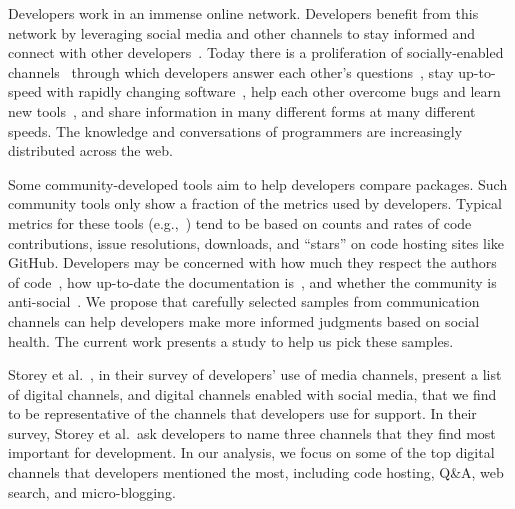 Developers work in an immense online network.
Developers benefit from this network by
leveraging social media and other channels to stay informed
and connect with other developers~\cite{singer_software_2014,storey_how_2016}.
Today there is a proliferation of socially-enabled channels~\cite{storey_revolution_2014} through which developers
answer each other's questions~\cite{mamykina_fastest_2011},
stay up-to-speed with rapidly changing software~\cite{linares-vasquez_how_2014},
help each other overcome bugs and learn new tools~\cite{parnin_blogging_2013},
and share information in many different forms at many different speeds.
The knowledge and conversations of programmers are increasingly distributed across the web.

Some community-developed tools aim to help developers compare packages.
Such community tools only show a fraction of the metrics used by developers.
Typical metrics for these tools (e.g.,~\cite{awesome_python,ruby_toolbox,package_quality}) tend to be based on counts and rates of code contributions, issue resolutions, downloads, and ``stars'' on code hosting sites like GitHub.
Developers may be concerned with
how much they respect the authors of code~\cite{robillard_field_2011},
how up-to-date the documentation is~\cite{storey_revolution_2014,nykaza_what_2002,lethbridge_how_2003,robillard_field_2011},
and whether the community is anti-social~\cite{storey_revolution_2014}.
We propose that carefully selected samples from communication channels can help developers make more informed judgments based on social health.
The current work presents a study to help us pick these samples.


Storey et al.~\cite{storey_revolution_2014}, in their survey of developers' use of media channels, present a list of digital channels, and digital channels enabled with social media, that we find to be representative of the channels that developers use for support.
In their survey, Storey et al.\ ask developers to name three channels that they find most important for development.
In our analysis, we focus on some of the top digital channels that developers mentioned the most, including code hosting, Q\&A, web search, and micro-blogging.

